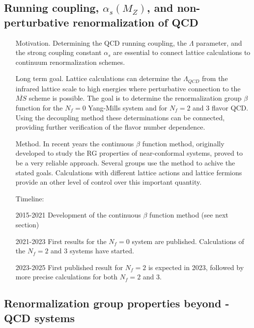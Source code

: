 \documentclass[prd,showpacs,showkeys,preprintnumbers,floatfix,
nofootinbib%
]{revtex4-2}
\begin{document}
\subsection{Running coupling, $\alpha_s(M_Z)$, and non-perturbative renormalization of QCD}
\begin{itemize}
   \item[Motivation.] Determining the QCD running coupling, the $\Lambda$ parameter, and the strong coupling constant $\alpha_s$ are essential to connect lattice calculations to continuum renormalization schemes. 
   \item[Long term goal.] Lattice calculations can determine the $\Lambda_{QCD}$  from the infrared lattice scale to high energies where perturbative connection to the ${\overline {MS}}$ scheme is possible. The goal is to determine the renormalization group $\beta$ function for the $N_f=0$ Yang-Mills system and for  $N_f=2$ and 3 flavor QCD. Using the decoupling method these determinations can be connected, providing further verification of the flavor number dependence.
   \item[Method.] In recent years the continuous $\beta$ function method, originally developed to study the RG properties of near-conformal systems, proved to be a very reliable approach. Several groups use the method to achive the stated goals. Calculations with  different lattice actions and lattice fermions  provide an other level of control over this important quantity.
\item[Timeline:] 
   \item[2015-2021] Development of the continuous $\beta$ function method (see next section)
   \item[2021-2023] First results for the $N_f=0$ system are published. Calculations of the $N_f=2$ and 3 systems have started. 
   \item[2023-2025] First published result for $N_f=2$ is expected in 2023, followed by more precise calculations for both $N_f=2$ and 3.
   
\end{itemize}

\subsection{Renormalization group properties beyond - QCD systems }
\end{document}
